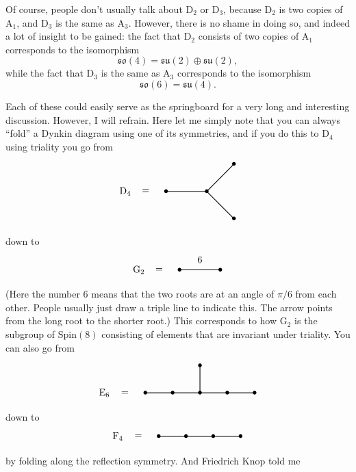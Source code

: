 \documentclass{article}
\begin{document}
Of course, people don't usually talk about \(\mathrm{D}_2\) or
\(\mathrm{D}_3\), because \(\mathrm{D}_2\) is two copies of
\(\mathrm{A}_1\), and \(\mathrm{D}_3\) is the same as \(\mathrm{A}_3\).
However, there is no shame in doing so, and indeed a lot of insight to
be gained: the fact that \(\mathrm{D}_2\) consists of two copies of
\(\mathrm{A}_1\) corresponds to the isomorphism
\[\mathfrak{so}(4) = \mathfrak{su}(2) \oplus \mathfrak{su}(2),\] while
the fact that \(\mathrm{D}_3\) is the same as \(\mathrm{A}_3\)
corresponds to the isomorphism \[\mathfrak{so}(6) = \mathfrak{su}(4).\]

Each of these could easily serve as the springboard for a very long and
interesting discussion. However, I will refrain. Here let me simply note
that you can always ``fold'' a Dynkin diagram using one of its
symmetries, and if you do this to \(\mathrm{D}_4\) using triality you go
from \[
  \begin{tikzpicture}
    \node at (0,0) {$\mathrm{D}_4$};
    \node at (0.75,0) {$=$};
    \draw[thick] (1.5,0) node{$\bullet$} to (3,0) node {$\bullet$};
    \draw[thick] (3,0) to (4,1) node {$\bullet$};
    \draw[thick] (3,0) to (4,-1) node {$\bullet$};
  \end{tikzpicture}
\] down to \[
  \begin{tikzpicture}
    \node at (0,0) {$\mathrm{G}_2$};
    \node at (0.75,0) {$=$};
    \draw[thick] (1.5,0) node{$\bullet$} to node[label=above:{6}]{} (3,0) node {$\bullet$};
  \end{tikzpicture}
\] (Here the number 6 means that the two roots are at an angle of
\(\pi/6\) from each other. People usually just draw a triple line to
indicate this. The arrow points from the long root to the shorter root.)
This corresponds to how \(\mathrm{G}_2\) is the subgroup of
\(\mathrm{Spin}(8)\) consisting of elements that are invariant under
triality. You can also go from \[
  \begin{tikzpicture}
    \node at (-1.5,0) {$\mathrm{E}_6$};
    \node at (-0.75,0) {$=$};
    \draw[thick] (0,0) node{$\bullet$} to (1,0) node{$\bullet$} to (2,0) node{$\bullet$} to (3,0) node {$\bullet$} to (4,0) node {$\bullet$};
    \draw[thick] (2,0) to (2,1) node{$\bullet$};
  \end{tikzpicture}
\] down to \[
  \begin{tikzpicture}
    \node at (-1.5,0) {$\mathrm{F}_4$};
    \node at (-0.75,0) {$=$};
    \draw[thick] (0,0) node{$\bullet$} to (1,0) node{$\bullet$} to (2,0) node{$\bullet$} to (3,0) node {$\bullet$};
  \end{tikzpicture}
\] by folding along the reflection symmetry. And Friedrich Knop told me
\end{document}
